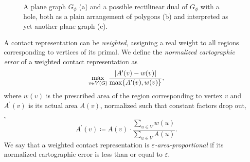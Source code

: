 \begin{figure}[H]
	\centering
	\quad
	\quad
	\caption{A plane graph $G_\phi$ (a) and a possible rectilinear dual of $G_\phi$ with a hole, both as a plain arrangement of polygons (b) and interpreted as yet another plane graph (c).}
	\label{fig:preliminaries-rectilinear-dual}
\end{figure}

A contact representation can be \emph{weighted}, assigning a real weight to all regions corresponding to vertices of its primal.
We define the \emph{normalized cartographic error} \cite{alam2015quantitative} of a weighted contact representation as
%
\begin{equation*}
    \max\limits_{v \in V(G)} \frac{\left\lvert A^\prime(v) - w(v)\right\rvert}{\max\{A^\prime(v),w(v)\}},
\end{equation*}
%
where $w(v)$ is the prescribed area of the region corresponding to vertex $v$ and $A^\prime(v)$ is its actual area $A(v)$, normalized such that constant factors drop out, \ie{},
%
\begin{equation*}
	A^\prime(v) \coloneqq A(v) \cdot \frac{\sum\limits_{u \in V}{w(u)}}{\sum\limits_{u \in V}{A(u)}}.
\end{equation*}
%
We say that a weighted contact representation is \emph{$\varepsilon$-area-proportional} if its normalized cartographic error is less than or equal to $\varepsilon$.



